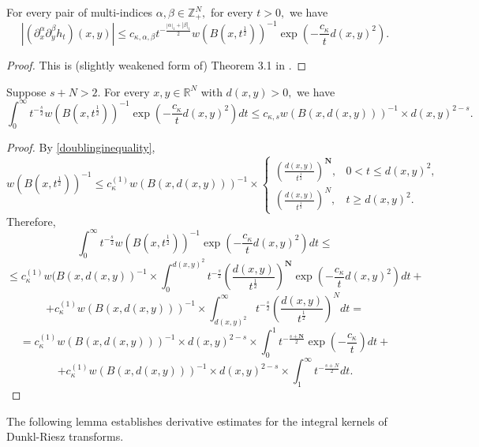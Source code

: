\documentclass{amsart}
\begin{document}
\begin{lemma}\label{heat kernel estimate} For every pair of multi-indices $\alpha,\beta\in\mathbb{Z}^N_+,$ for every $t>0,$ we have
$$|(\partial_x^{\alpha}\partial_y^{\beta}h_t)(x,y)|\leq c_{\kappa,\alpha,\beta}t^{-\frac{|\alpha|_1+|\beta|_1}{2}}w(B(x,t^{\frac12}))^{-1}\exp(-\frac{c_{\kappa}}{t}d(x,y)^2).$$
\end{lemma}
\begin{proof} This is (slightly weakened form of) Theorem 3.1 in \cite{MR4042416}.
\end{proof}

\begin{lemma}\label{zhijie kernel estimate}
Suppose $s+N>2.$ For every $x,y\in\mathbb{R}^N$ with $d(x,y)>0,$ we have
$$\int_0^{\infty}t^{-\frac{s}{2}}w(B(x,t^{\frac12}))^{-1}\exp(-\frac{c_{\kappa}}{t}d(x,y)^2)dt
\leq c_{\kappa,s}w(B(x,d(x,y)))^{-1}\times d(x,y)^{2-s}.$$
\end{lemma}
\begin{proof} By \eqref{doublinginequality},
$$w(B(x,t^{\frac12}))^{-1}\leq c_{\kappa}^{(1)}w(B(x,d(x,y)))^{-1}\times
\begin{cases}
\left(\frac{d(x,y)}{t^{\frac12}}\right)^{\mathbf{N}},
&0<t\leq d(x,y)^2,\\
\left(\frac{d(x,y)}{t^{\frac12}}\right)^N,&t\geq d(x,y)^2.
\end{cases}$$
Therefore,
$$\int_0^{\infty}t^{-\frac{s}{2}}w(B(x,t^{\frac12}))^{-1}\exp(-\frac{c_{\kappa}}{t}d(x,y)^2)dt\leq$$
$$\leq c_{\kappa}^{(1)}w(B(x,d(x,y))^{-1}\times\int_0^{d(x,y)^2}t^{-\frac{s}{2}}\left(\frac{d(x,y)}{t^{\frac12}}\right)^{\mathbf{N}}\exp(-\frac{c_{\kappa}}{t}d(x,y)^2)dt+$$
$$+c_{\kappa}^{(1)}w(B(x,d(x,y)))^{-1}\times\int_{d(x,y)^2}^{\infty}t^{-\frac{s}{2}}\left(\frac{d(x,y)}{t^{\frac12}}\right)^Ndt=$$
$$=c_{\kappa}^{(1)}w(B(x,d(x,y)))^{-1}\times d(x,y)^{2-s}\times\int_0^1t^{-\frac{s+\mathbf{N}}{2}}\exp(-\frac{c_{\kappa}}{t})dt+$$
$$+c_{\kappa}^{(1)}w(B(x,d(x,y)))^{-1}\times d(x,y)^{2-s}\times\int_1^{\infty}t^{-\frac{s+N}{2}}dt.$$
\end{proof}

The following lemma establishes derivative estimates for the integral kernels of Dunkl-Riesz transforms.
\end{document}

